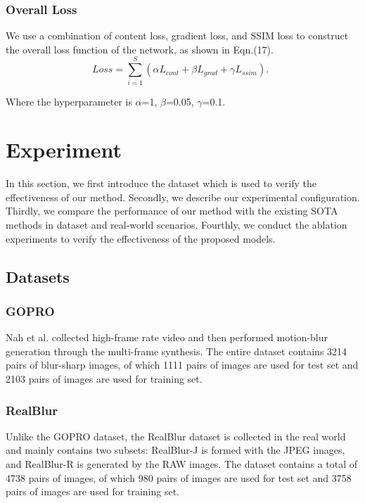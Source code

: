 \begin{sloppypar}
\subsubsection{Overall Loss}
We use a combination of content loss, gradient loss, and SSIM loss to construct the overall loss function of the network, as shown in Eqn.(17).
\begin{equation}
	    Loss = \sum_{i=1}^{S}(\alpha L_{cont} + \beta L_{grad} + \gamma L_{ssim}). \enspace
\end{equation}

Where the hyperparameter is $\alpha$=1, $\beta$=0.05, $\gamma$=0.1.

\section{Experiment}
In this section, we first introduce the dataset which is used to verify the effectiveness of our method. Secondly, we describe our experimental configuration. Thirdly, we compare the performance of our method with the existing SOTA methods in dataset and real-world scenarios. Fourthly, we conduct the ablation experiments to verify the effectiveness of the proposed models.
\subsection{Datasets}
\subsubsection{GOPRO}
Nah et al.\cite{3} collected high-frame rate video and then performed motion-blur generation through the multi-frame synthesis. The entire dataset contains 3214 pairs of blur-sharp images, of which 1111 pairs of images are used for test set and 2103 pairs of images are used for training set.

\subsubsection{RealBlur}
Unlike the GOPRO dataset, the RealBlur\cite{25} dataset is collected in the real world and mainly contains two subsets: RealBlur-J is formed with the JPEG images, and RealBlur-R is generated by the RAW images. The dataset contains a total of 4738 pairs of images, of which 980 pairs of images are used for test set and 3758 pairs of images are used for training set.

\end{sloppypar}
